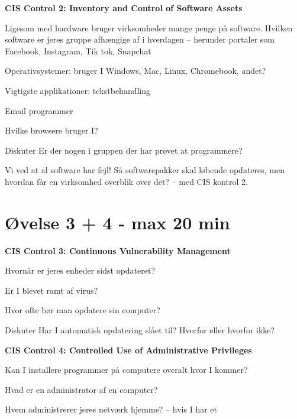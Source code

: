\documentclass[a4paper,11pt,notitlepage,landscape]{report}
\begin{document}
{\bf CIS Control 2: Inventory and Control of Software Assets}

Ligesom med hardware bruger virksomheder mange penge på software. Hvilken software er jeres gruppe afhængige af i hverdagen -- herunder portaler som Facebook, Instagram, Tik tok, Snapchat

\begin{list1}
\item[\faSquareO] Operativsystemer: bruger I Windows, Mac, Linux, Chromebook, andet?
\item[\faSquareO] Vigtigste applikationer: tekstbehandling
\item[\faSquareO] Email programmer
\item[\faSquareO] Hvilke browsere bruger I?
\end{list1}

Diskuter Er der nogen i gruppen der har prøvet at programmere?

Vi ved at al software har fejl! Så softwarepakker skal løbende opdateres, men hvordan får en virksomhed overblik over det? -- med CIS kontrol 2.

\eject

\section*{Øvelse 3 + 4 - max 20 min}

{\bf CIS Control 3: Continuous Vulnerability Management}
\begin{list1}
\item[\faSquareO] Hvornår er jeres enheder sidst opdateret?
\item[\faSquareO] Er I blevet ramt af virus?
\item[\faSquareO] Hvor ofte bør man opdatere sin computer?
\end{list1}

Diskuter Har I automatisk opdatering slået til? Hvorfor eller hvorfor ikke?


{\bf  CIS Control 4: Controlled Use of Administrative Privileges}

\begin{list1}
\item[\faSquareO] Kan I installere programmer på computere overalt hvor I kommer?
\item[\faSquareO] Hvad er en administrator af en computer?
\item[\faSquareO] Hvem administrerer jeres netværk hjemme? -- hvis I har et
\end{list1}
\end{document}
